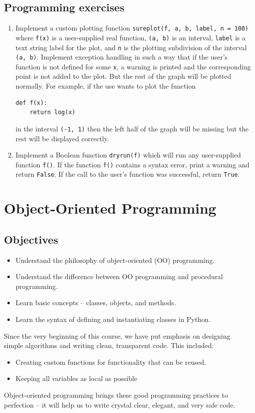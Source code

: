 \subsection{Programming exercises}

\begin{enumerate}
\item Implement a custom plotting function {\tt sureplot(f, a, b, label, n = 100)} where {\tt f(x)} is 
      a user-supplied real function, {\tt (a, b)} is an interval, {\tt label} 
      is a text string label for the plot, and {\tt n} is the plotting subdivision of the interval {\tt (a, b)}.
      Implement exception handling in such a way that if the user's function is not defined for some {\tt x}, 
      a warning is printed and the corresponding point is not added to the plot. But the rest of the graph
      will be plotted normally. For example, if the use wants to plot the function 
\begin{verbatim}
def f(x):
    return log(x)
\end{verbatim}
in the interval {\tt (-1, 1)} then the left half of the graph will be missing but the rest 
will be displayed correctly.
\item Implement a Boolean function {\tt dryrun(f)} which will run any user-supplied function {\tt f()}.
      If the function {\tt f()} contains a syntax error, print a warning and return {\tt False}. If the 
      call to the user's function was successful, return {\tt True}.
\end{enumerate}

\section{Object-Oriented Programming}

\subsection{Objectives}

\begin{itemize}
\item Understand the philosophy of object-oriented (OO) programming.
\item Understand the difference between OO programming and procedural programming.
\item Learn basic concepts -- classes, objects, and methods.
\item Learn the syntax of defining and instantiating classes in Python.
\end{itemize}
Since the very beginning of this course, 
we have put emphasis on designing simple algorithms
and writing clean, transparent code. This included:
\begin{itemize}
\item Creating custom functions for functionality that can be reused.
\item Keeping all variables as local as possible
\end{itemize}
Object-oriented programming brings these good programming practices to
perfection -- it will help us to write crystal clear, elegant, and very safe code.

